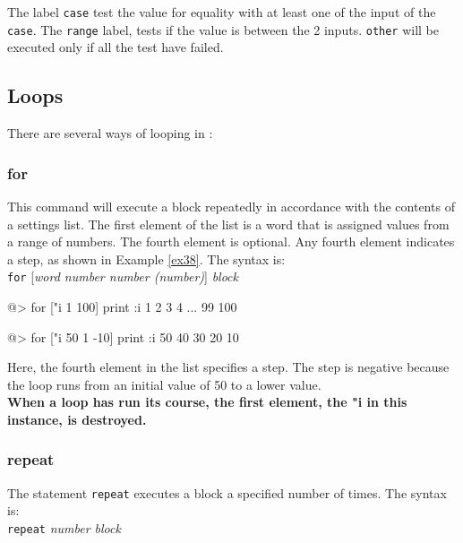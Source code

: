 The label {\tt case} test the value for equality with at least one of the input of the {\tt case}. The {\tt range} label, tests if the value is between the 2 inputs. {\tt other} will be executed only if all the test have failed.
 
\subsection{Loops} 
 
There are several ways of looping in \squirrel:

\subsubsection*{for} 
 
This command will execute a block repeatedly in accordance with the contents
of a settings list.  The first element of the list is a word that is assigned values from a range of numbers.  The fourth element is optional.
Any fourth element indicates a step, as shown in Example \ref{ex38}. The syntax is: \\ 
 
{\tt for} [{\it word number number (number)}] {\it block} \\
 
\begin{verbatimtab}  
@> for ["i 1 100] {print :i} 
1
2
3
4
...
99
100
\end{verbatimtab}

\begin{verbatimtab}
@> for ["i 50 1 -10] {print :i}
50
40 
30 
20 
10
\end{verbatimtab}
 
Here, the fourth element in the list specifies a step.  The step is negative because the loop runs from an initial value of 50 to a lower value.\\

{\bf When a loop has run its course, the first element, the "i in this instance, is destroyed.}
 
\subsubsection*{repeat} 
 
The statement {\tt repeat} executes a block a specified number of times. The syntax is:\\ 
  
{\tt repeat} {\it number block}\\ 


